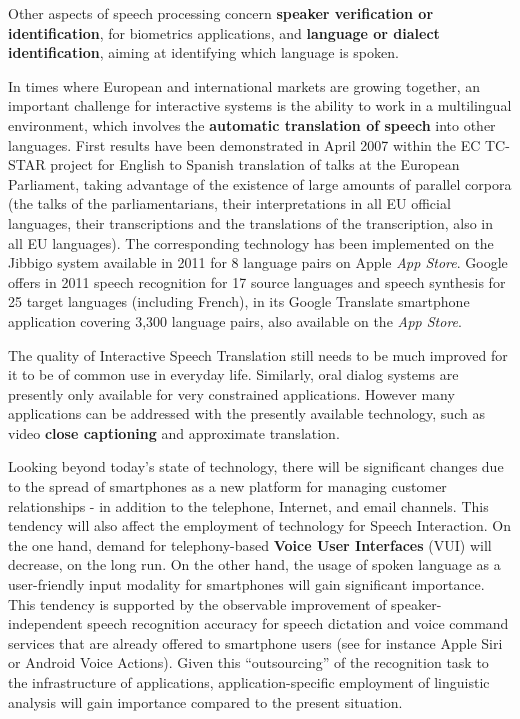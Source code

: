\begin{multicols}{2}
Other aspects of speech processing concern {\bf speaker verification or
identification}, for biometrics applications, and {\bf language or dialect
identification}, aiming at identifying which language is spoken.

In times where European and international markets are growing
together, an important challenge for interactive systems is the
ability to work in a multilingual environment, which involves the
{\bf automatic translation of speech} into other languages. First results
have been demonstrated in April 2007 within the EC TC-STAR\cite{tcstarurl} project
for English to Spanish translation of talks at the European
Parliament, taking advantage of the existence of large amounts of
parallel corpora (the talks of the parliamentarians, their
interpretations in all EU official languages, their transcriptions and
the translations of the transcription, also in all EU languages). The
corresponding technology has been implemented on the Jibbigo\cite{jibbigo} system
available in 2011 for 8 language pairs on Apple {\em App Store}. Google offers
in 2011 speech recognition for 17 source languages and speech synthesis
for 25 target languages (including French), in its Google Translate
smartphone application covering 3,300 language pairs, also available
on the {\em App Store}.

The quality of Interactive Speech Translation still needs to be much
improved for it to be of common use in everyday life. Similarly, oral
dialog systems are presently only available for very constrained
applications. However many applications can be addressed with the
presently available technology, such as video {\bf close captioning}
and approximate translation.

Looking beyond today's state of technology, there will be
significant changes due to the spread of smartphones as a new platform
for managing customer relationships - in addition to the telephone,
Internet, and email channels. This tendency will also affect the
employment of technology for Speech Interaction. On the one hand,
demand for telephony-based {\bf Voice User Interfaces} (VUI) will
decrease, on the long run. On the other hand, the usage of spoken
language as a user-friendly input modality for smartphones will gain
significant importance. This tendency is supported by the observable
improvement of speaker-independent speech recognition accuracy for
speech dictation and voice command services that are already offered
to smartphone users (see for instance Apple Siri or Android Voice
Actions). Given this ``outsourcing'' of the recognition
task to the infrastructure of applications, application-specific
employment of linguistic analysis will gain importance compared to the
present situation.


\end{multicols}
